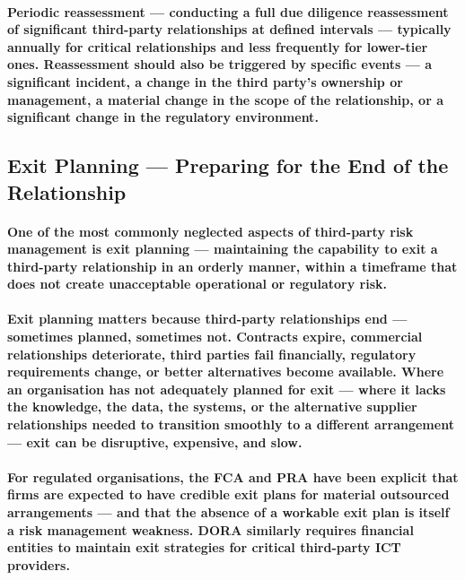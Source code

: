 \paragraph{\textbf{Periodic reassessment} — conducting a full due diligence reassessment of significant third-party relationships at defined intervals — typically annually for critical relationships and less frequently for lower-tier ones. Reassessment should also be triggered by specific events — a significant incident, a change in the third party's ownership or management, a material change in the scope of the relationship, or a significant change in the regulatory environment.}

\subsection{Exit Planning — Preparing for the End of the Relationship}
\paragraph{One of the most commonly neglected aspects of third-party risk management is exit planning — maintaining the capability to exit a third-party relationship in an orderly manner, within a timeframe that does not create unacceptable operational or regulatory risk.}
\paragraph{Exit planning matters because third-party relationships end — sometimes planned, sometimes not. Contracts expire, commercial relationships deteriorate, third parties fail financially, regulatory requirements change, or better alternatives become available. Where an organisation has not adequately planned for exit — where it lacks the knowledge, the data, the systems, or the alternative supplier relationships needed to transition smoothly to a different arrangement — exit can be disruptive, expensive, and slow.}
\paragraph{For regulated organisations, the FCA and PRA have been explicit that firms are expected to have credible exit plans for material outsourced arrangements — and that the absence of a workable exit plan is itself a risk management weakness. DORA similarly requires financial entities to maintain exit strategies for critical third-party ICT providers.}
